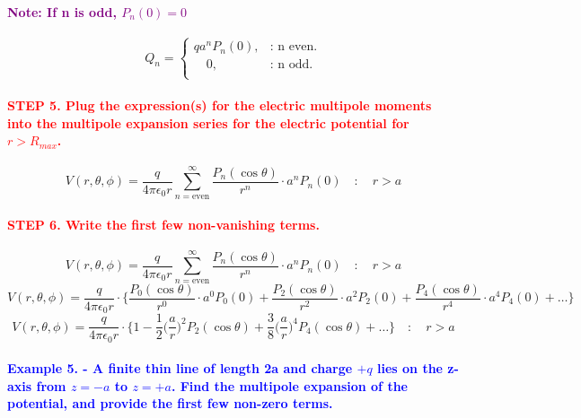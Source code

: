 \documentclass{article}
\begin{document}
\paragraph{\textcolor{purple}{Note: If n is odd, $P_n(0)=0$}}
\begin{equation*}
    Q_n=\begin{cases}
        qa^nP_n(0), & \text{: n even}.\\
        \quad 0, & \text{: n odd}.\\
    \end{cases}
\end{equation*}
\paragraph{\textcolor{red}{STEP 5. Plug the expression(s) for the electric multipole moments into the multipole expansion series for the electric potential for $r>R_{max}$.}}
\begin{equation*}
    V(r,\theta,\phi)=\frac{q}{4\pi\epsilon_0r}\sum_{n=\text{even}}^{\infty} \frac{P_n(\cos\theta)}{r^n}\cdot a^nP_n(0)\quad:\quad r>a
\end{equation*}
\paragraph{\textcolor{red}{STEP 6. Write the first few non-vanishing terms.}}
\begin{equation*}
    V(r,\theta,\phi)=\frac{q}{4\pi\epsilon_0r}\sum_{n=\text{even}}^{\infty} \frac{P_n(\cos\theta)}{r^n}\cdot a^nP_n(0)\quad:\quad r>a
\end{equation*}
\begin{equation*}
    V(r,\theta,\phi)=\frac{q}{4\pi\epsilon_0r}\cdot \bigg\{ \frac{P_0(\cos\theta)}{r^0}\cdot a^0P_0(0)+\frac{P_2(\cos\theta)}{r^2}\cdot a^2P_2(0)+\frac{P_4(\cos\theta)}{r^4}\cdot a^4P_4(0)+\dots\bigg\}
\end{equation*}
\begin{equation*}
     V(r,\theta,\phi)=\frac{q}{4\pi\epsilon_0r}\cdot \bigg\{ 1-\frac{1}{2}\bigg( \frac{a}{r}\bigg)^2P_2(\cos\theta)+\frac{3}{8}\bigg(\frac{a}{r}\bigg)^4P_4(\cos\theta)+\dots\bigg\}\quad:\quad r>a
\end{equation*}
\paragraph{\textcolor{blue}{Example 5. - A finite thin line of length 2a and charge $+q$ lies on the z-axis from $z=-a$ to $z=+a$. Find the multipole expansion of the potential, and provide the first few non-zero terms.}}
\end{document}
